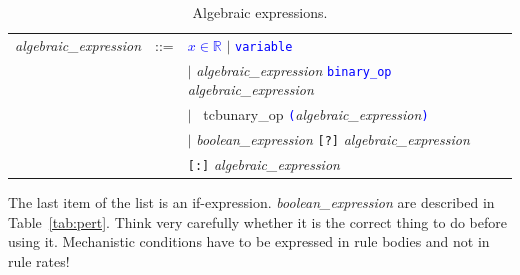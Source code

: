 \documentclass[11pt]{book}
\def\tcb#1{\textcolor{blue}{\ttt{#1}}}
\def\ttt#1{\texttt{#1}}
\def\Real{\mathbb R}
\begin{document}
\begin{table}[htbp]
  \centering
  \caption{Algebraic expressions.}
  \begin{tabular}{@{} lcl @{}}
    \textit{algebraic\_expression} & ::= & \tcb{$x\in\Real$} $\mid$ \tcb{variable} \\
     &  & $\mid$ \textit{algebraic\_expression} \tcb{binary\_op} \textit{algebraic\_expression}\\
     &  & $\mid$ \ tcb{unary\_op} \tcb{(}\textit{algebraic\_expression}\tcb{)} \\
     &  & $\mid$ \textit{boolean\_expression}  \ttt{[?]} \textit{algebraic\_expression} \\
     & & \hspace*{2cm} \ttt{[:]} \textit{algebraic\_expression}\\
  \end{tabular}
  \label{tab:alg}
  \end{table}
The last item of the list is an
if-expression. \textit{boolean\_expression} are described in
Table~\ref{tab:pert}. Think very carefully whether it is the correct
thing to do before using it. Mechanistic conditions have to be
expressed in rule bodies and not in rule rates!

\end{document}
